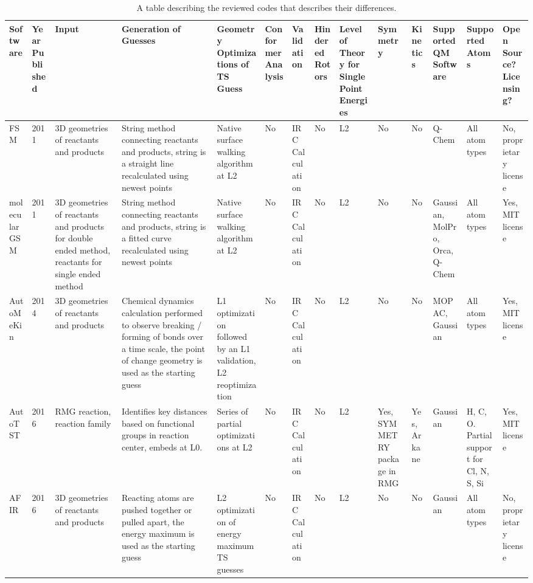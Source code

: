 \documentclass[preprint, 11pt]{elsarticle} %
\begin{document}
\begin{landscape}
\begin{singlespace}
\begin{scriptsize}
\tiny
\begin{longtable}{| p{0.5in} | p{0.25in} | p{0.45in} | p{0.8in} | p{0.7in}| p{0.5in}| p{0.5in }| p{0.45in}| p{0.45in}| p{0.5in}| p{0.45in}| p{0.5in}| p{0.5in} | p{0.45in} |}
\caption{A table describing the reviewed codes that describes their differences.}
\label{table:comparison}

Software  &  Year Published  &  Input  &  Generation of Guesses  &  Geometry Optimizations of TS Guess &  Conformer Analysis  &  Validation  &  Hindered Rotors  & Level of Theory for Single Point Energies &  Symmetry  &  Kinetics  &  Supported QM Software  &  Supported Atoms  &  Open Source? Licensing?  \\ 
\hline
\hline
FSM & 2011 &  3D geometries of reactants and products  & String method connecting reactants and products, string is a straight line recalculated using newest points & Native surface walking algorithm at L2 & No &  IRC Calculation  & No & L2 & No & No & Q-Chem & All atom types &  No, proprietary license  \\ 
\hline
molecularGSM & 2011 &  3D geometries of reactants and products for double ended method, reactants for single ended method & String method connecting reactants and products, string is a fitted curve recalculated using newest points & Native surface walking algorithm at L2 & No &  IRC Calculation  & No & L2 & No & No & Gaussian, MolPro, Orca, Q-Chem & All atom types &  Yes, MIT license  \\ 
\hline
AutoMeKin & 2014 &  3D geometries of reactants and products  & Chemical dynamics calculation performed to observe breaking / forming of bonds over a time scale, the point of change geometry is used as the starting guess & L1 optimization followed by an L1 validation, L2 reoptimization & No &  IRC Calculation  & No & L2 & No & No & MOPAC, Gaussian & All atom types &  Yes, MIT license  \\ 
\hline
AutoTST  & 2016 &  RMG reaction, reaction family  &  Identifies key distances based on functional groups in reaction center, embeds at L0.  &  Series of partial optimizations at L2  &  No  &  IRC Calculation  &  No  & L2 &  Yes, SYMMETRY package in RMG  &  Yes, Arkane  &  Gaussian  &  H, C, O. Partial support for Cl, N, S, Si  &  Yes, MIT license  \\ 
\hline
AFIR & 2016 &  3D geometries of reactants and products  & Reacting atoms are pushed together or pulled apart, the energy maximum is used as the starting guess & L2 optimization of energy maximum TS guesses & No &  IRC Calculation  & No & L2 & No & No & Gaussian & All atom types &  No, proprietary license  \\ 

\end{longtable}
\end{scriptsize}
\end{singlespace}
\end{landscape}
\end{document}
